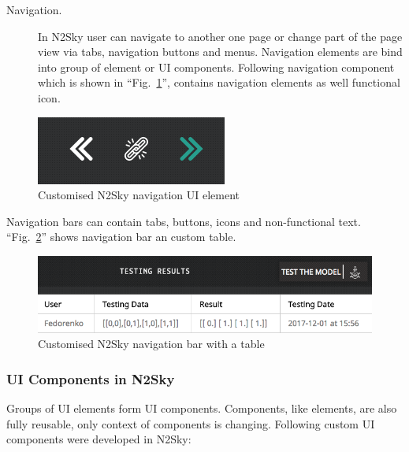 \begin{description}
\item[Navigation.] In N2Sky user can navigate to another one page or change part of the page view via tabs, navigation buttons and menus. 
Navigation elements are bind into group of element or UI components. Following navigation component which is shown in ``Fig.~\ref{fig:nav}'', contains navigation elements as well functional icon. 
\end{description}

\begin{figure}[htbp]
\begin{center}
  \includegraphics[scale=0.65]{components/3/components/nav.png}
  \caption{Customised N2Sky navigation UI element}
  \label{fig:nav}
\end{center}
\end{figure}

Navigation bars can contain tabs, buttons, icons and non-functional text. ``Fig.~\ref{fig:nav_bar}'' shows navigation bar an custom table. 

\begin{figure}[htbp]
\begin{center}
  \includegraphics[scale=0.65]{components/3/components/nav_bar.png}
  \caption{Customised N2Sky navigation bar with a table}
  \label{fig:nav_bar}
\end{center}
\end{figure}

\subsubsection{UI Components in N2Sky}\label{UI Components in N2Sky}

Groups of UI elements form UI components. Components, like elements, are also fully reusable, only context of components is changing. Following custom UI components were developed in N2Sky: 


